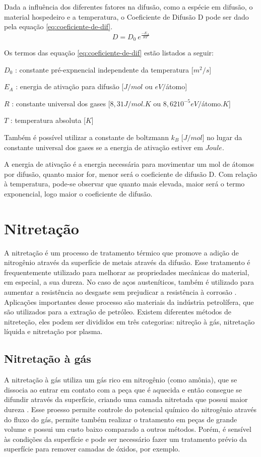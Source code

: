 \documentclass[]{politex}
\begin{document}
	Dada a influência dos diferentes fatores na difusão, como a espécie em difusão, o material hospedeiro e a temperatura, o Coeficiente de Difusão D pode ser dado pela equação \autoref{eq:coeficiente-de-dif}.
\begin{equation} \label{eq:coeficiente-de-dif}
	D = D_0 \ {e^{\frac{-E_A}{RT}}}		
\end{equation}

Os termos das equação \autoref{eq:coeficiente-de-dif} estão listados a seguir:

$D_0$ : constante pré-expnencial independente da temperatura [$m^2/s$]

$E_A$ : energia de ativação para difusão [$J/mol$ ou $eV/$átomo]

$R$ : constante universal dos gases [$8,31 J/mol.K$ ou $8,62 10^{-5} eV/$átomo$.K$]

$T$ : temperatura absoluta [$K$]

Também é possível utilizar a constante de boltzmann $k_B$ [$J/mol$] no lugar da constante universal dos gases se a energia de ativação estiver em $Joule$.

A energia de ativação é a energia necessária para movimentar um mol de átomos por difusão, quanto maior for, menor será o coeficiente de difusão D. Com relação à temperatura, pode-se observar que quanto mais elevada, maior será o termo exponencial, logo maior o coeficiente de difusão.

\section{Nitretação}
	A nitretação é um processo de tratamento térmico que promove a adição de nitrogênio através da superfície de metais através da difusão. Esse tratamento é frequentemente utilizado para melhorar as propriedades mecânicas do material, em especial, a sua dureza. No caso de aços austeníticos, também é utilizado para aumentar a resistência ao desgaste sem prejudicar a resistência à corrosão \cite{baranowska2010importance}.
	 Aplicações importantes desse processo são materiais da indústria petrolífera, que são utilizados para a extração de petróleo.
	 Existem diferentes métodos de nitreteção, eles podem ser divididos em três categorias: nitreção à gás,  nitretação líquida e nitretação por plasma.
	 
\subsection{Nitretação à gás}
	A nitretação à gás utiliza um gás rico em nitrogênio (como amônia), que se dissocia ao entrar em contato com a peça que é aquecida e então consegue se difundir através da superfície, criando uma camada nitretada que possui maior dureza \cite{zimmermannnitretaccao}.   
	Esse proesso permite controle do potencial químico do nitrogênio através do fluxo do gás, permite também realizar o tratamento em peças de grande volume e possui um custo baixo comparado a outros métodos. Porém, é sensível às condições da superfície e pode ser necessário fazer um tratamento prévio da superfície para remover camadas de óxidos, por exemplo.
	 
\end{document}
